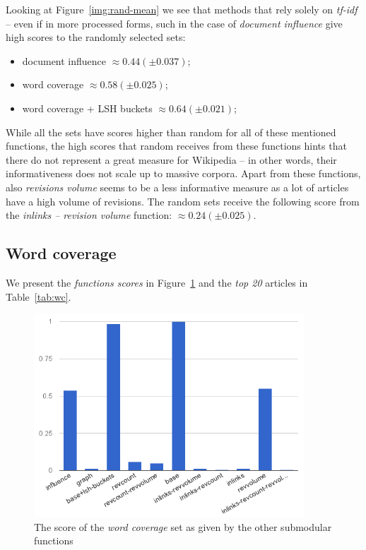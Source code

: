 Looking at Figure~\ref{img:rand-mean} we see that methods that rely solely on
\emph{tf-idf} -- even if in more processed forms, such in the case of
\emph{document influence} give high scores to the randomly selected sets:
\begin{itemize}
  \item document influence \(\approx 0.44 (\pm 0.037)\);
  \item word coverage \(\approx 0.58 (\pm 0.025)\);
  \item word coverage + LSH buckets \(\approx 0.64 (\pm 0.021)\);
\end{itemize}
While all the sets have scores higher than random for all of these mentioned
functions, the high scores that random receives from these functions hints that
there do not represent a great measure for Wikipedia -- in other words, their
informativeness does not scale up to massive corpora.
Apart from these functions, also \emph{revisions volume} seems to be a less
informative measure as a lot of articles have a high volume of revisions.
The random sets receive the following score from the \emph{inlinks -- revision
volume} function: \(\approx 0.24 (\pm 0.025)\).

\subsection{Word coverage}

We present the \emph{functions scores} in Figure~\ref{img:wc} and the \emph{top
20} articles in Table~\ref{tab:wc}.

\begin{figure}
  \centering
  \includegraphics[width=0.9\textwidth,natwidth=555,natheight=419]{images/wc.png}
  \caption{The score of the \emph{word coverage} set as given by the other
  submodular functions}
  \label{img:wc}
\end{figure}

